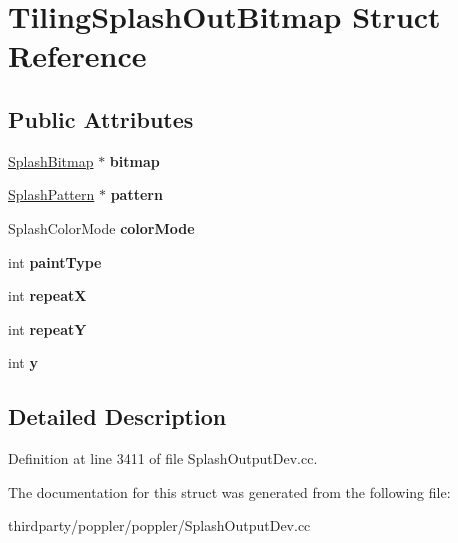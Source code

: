 \hypertarget{struct_tiling_splash_out_bitmap}{}\section{Tiling\+Splash\+Out\+Bitmap Struct Reference}
\label{struct_tiling_splash_out_bitmap}
\subsection*{Public Attributes}
\begin{DoxyCompactItemize}
\item 
\mbox{\label{struct_tiling_splash_out_bitmap_a78af72054f5f47cb79d81558740807ad}} 
\hyperlink{class_splash_bitmap}{Splash\+Bitmap} $\ast$ {\bfseries bitmap}
\item 
\mbox{\label{struct_tiling_splash_out_bitmap_a60fc69d3a99201cbf070d69a8663dc91}} 
\hyperlink{class_splash_pattern}{Splash\+Pattern} $\ast$ {\bfseries pattern}
\item 
\mbox{\label{struct_tiling_splash_out_bitmap_afbea1f1ffbf97ca2ec3dea18b1272db3}} 
Splash\+Color\+Mode {\bfseries color\+Mode}
\item 
\mbox{\label{struct_tiling_splash_out_bitmap_aca2172cbdec657a1595e1edfd62a9099}} 
int {\bfseries paint\+Type}
\item 
\mbox{\label{struct_tiling_splash_out_bitmap_a7058b11226af510a598a36e8a6933efc}} 
int {\bfseries repeatX}
\item 
\mbox{\label{struct_tiling_splash_out_bitmap_a747b4b36ca8df02d1bad8201a1bb9ff9}} 
int {\bfseries repeatY}
\item 
\mbox{\label{struct_tiling_splash_out_bitmap_a24c1692471dfed34f9378b9a15f2150b}} 
int {\bfseries y}
\end{DoxyCompactItemize}


\subsection{Detailed Description}


Definition at line 3411 of file Splash\+Output\+Dev.\+cc.



The documentation for this struct was generated from the following file\+:\begin{DoxyCompactItemize}
\item 
thirdparty/poppler/poppler/Splash\+Output\+Dev.\+cc\end{DoxyCompactItemize}
